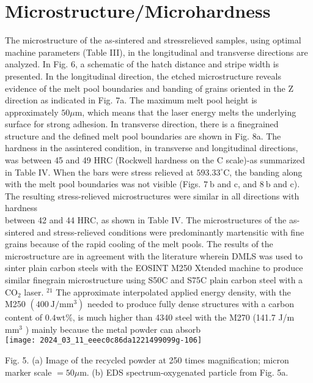 \documentclass[10pt]{article}
\begin{document}
\section*{Microstructure/Microhardness}
The microstructure of the as-sintered and stressrelieved samples, using optimal machine parameters (Table III), in the longitudinal and transverse directions are analyzed. In Fig. 6, a schematic of the hatch distance and stripe width is presented. In the longitudinal direction, the etched microstructure reveals evidence of the melt pool boundaries and banding of grains oriented in the $\mathrm{Z}$ direction as indicated in Fig. 7a. The maximum melt pool height is approximately $50 \mu \mathrm{m}$, which means that the laser energy melts the underlying surface for strong adhesion. In transverse direction, there is a finegrained structure and the defined melt pool boundaries are shown in Fig. 8a. The hardness in the assintered condition, in transverse and longitudinal directions, was between 45 and 49 HRC (Rockwell hardness on the $\mathrm{C}$ scale)-as summarized in Table IV. When the bars were stress relieved at $593.33^{\circ} \mathrm{C}$, the banding along with the melt pool boundaries was not visible (Figs. $7 \mathrm{~b}$ and $\mathrm{c}$, and $8 \mathrm{~b}$ and c). The resulting stress-relieved microstructures were similar in all directions with hardness\\
between 42 and 44 HRC, as shown in Table IV. The microstructures of the as-sintered and stress-relieved conditions were predominantly martensitic with fine grains because of the rapid cooling of the melt pools. The results of the microstructure are in agreement with the literature wherein DMLS was used to sinter plain carbon steels with the EOSINT M250 Xtended machine to produce similar finegrain microstructure using S50C and S75C plain carbon steel with a $\mathrm{CO}_{2}$ laser. ${ }^{21}$ The approximate interpolated applied energy density, with the M250 $\left(400 \mathrm{~J} / \mathrm{mm}^{3}\right)$ needed to produce fully dense structures with a carbon content of $0.4 \mathrm{wt} \%$, is much higher than 4340 steel with the M270 (141.7 J/m $\mathrm{mm}^{3}$ ) mainly because the metal powder can absorb\\
\texttt{[image: 2024\_03\_11\_eeec0c86da1221499099g-106]}

Fig. 5. (a) Image of the recycled powder at 250 times magnification; micron marker scale $=50 \mu \mathrm{m}$. (b) EDS spectrum-oxygenated particle from Fig. 5a.
\end{document}
